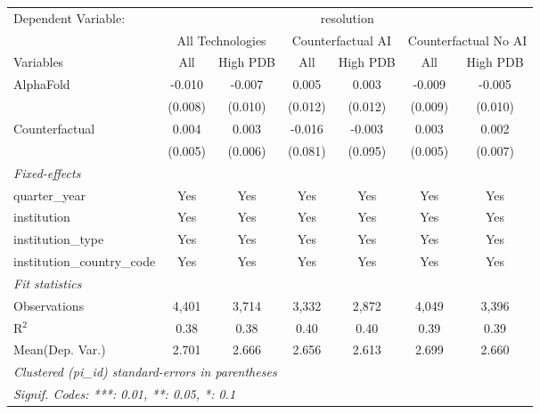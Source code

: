 \begingroup
\centering
\begin{tabular}{lcccccc}
   \tabularnewline \midrule \midrule
   Dependent Variable: & \multicolumn{6}{c}{resolution}\\
 & \multicolumn{2}{c}{All Technologies} & \multicolumn{2}{c}{Counterfactual AI} & \multicolumn{2}{c}{Counterfactual No AI} \\
\cmidrule(lr){1-1}\cmidrule(lr){2-3} \cmidrule(lr){4-5} \cmidrule(lr){6-7}
Variables & \multicolumn{1}{c}{All} & \multicolumn{1}{c}{High PDB} & \multicolumn{1}{c}{All} & \multicolumn{1}{c}{High PDB} & \multicolumn{1}{c}{All} & \multicolumn{1}{c}{High PDB} \\
\cmidrule(lr){1-1}\cmidrule(lr){2-2} \cmidrule(lr){3-3} \cmidrule(lr){4-4} \cmidrule(lr){5-5} \cmidrule(lr){6-6} \cmidrule(lr){7-7}
   AlphaFold                    & -0.010  & -0.007  & 0.005   & 0.003   & -0.009  & -0.005\\   
                                & (0.008) & (0.010) & (0.012) & (0.012) & (0.009) & (0.010)\\   
   Counterfactual               & 0.004   & 0.003   & -0.016  & -0.003  & 0.003   & 0.002\\   
                                & (0.005) & (0.006) & (0.081) & (0.095) & (0.005) & (0.007)\\   
   \midrule
   \emph{Fixed-effects}\\
   quarter\_year                & Yes     & Yes     & Yes     & Yes     & Yes     & Yes\\  
   institution                  & Yes     & Yes     & Yes     & Yes     & Yes     & Yes\\  
   institution\_type            & Yes     & Yes     & Yes     & Yes     & Yes     & Yes\\  
   institution\_country\_code   & Yes     & Yes     & Yes     & Yes     & Yes     & Yes\\  
   \midrule
   \emph{Fit statistics}\\
   Observations                 & 4,401   & 3,714   & 3,332   & 2,872   & 4,049   & 3,396\\  
   R$^2$                        & 0.38    & 0.38    & 0.40    & 0.40    & 0.39    & 0.39\\  
Mean(Dep. Var.) & 2.701 & 2.666 & 2.656 & 2.613 & 2.699 & 2.660 \\
   \midrule \midrule
   \multicolumn{7}{l}{\emph{Clustered (pi\_id) standard-errors in parentheses}}\\
   \multicolumn{7}{l}{\emph{Signif. Codes: ***: 0.01, **: 0.05, *: 0.1}}\\
\end{tabular}
\par\endgroup
